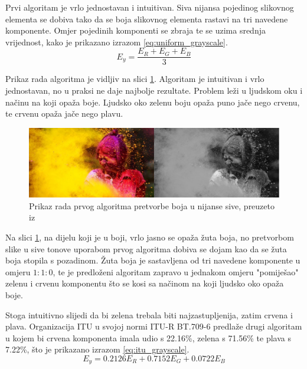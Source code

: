 Prvi algoritam je vrlo jednostavan i intuitivan. Siva nijansa pojedinog slikovnog elementa se dobiva tako da se boja slikovnog elementa rastavi na tri navedene komponente. Omjer pojedinih komponenti se zbraja te se uzima srednja vrijednost, kako je prikazano izrazom \eqref{eq:uniform_grayscale}.
\begin{equation} \label{eq:uniform_grayscale}
E_y = \frac{E_R + E_G + E_B}{3}
\end{equation}

Prikaz rada algoritma je vidljiv na slici \ref{fig:grayscale_uniform_example}. Algoritam je intuitivan i vrlo jednostavan, no u praksi ne daje najbolje rezultate. Problem leži u ljudskom oku i načinu na koji opaža boje. Ljudsko oko zelenu boju opaža puno jače nego crvenu, te crvenu opaža jače nego plavu.

\begin{figure}[htb]
    \centering
    \includegraphics[width=14.5cm]{images/grayscale_uniform_example_h.jpg}
    \caption{Prikaz rada prvog algoritma pretvorbe boja u nijanse sive, preuzeto iz \citep{grayscaleImg}}
    \label{fig:grayscale_uniform_example}
\end{figure}

Na slici \ref{fig:grayscale_uniform_example}, na dijelu koji je u boji, vrlo jasno se opaža žuta boja, no pretvorbom slike u sive tonove uporabom prvog algoritma dobiva se dojam kao da se žuta boja stopila s pozadinom. Žuta boja je sastavljena od tri navedene komponente u omjeru $1:1:0$, te je predloženi algoritam zapravo u jednakom omjeru "pomiješao" zelenu i crvenu komponentu što se kosi sa načinom na koji ljudsko oko opaža boje.

Stoga intuitivno slijedi da bi zelena trebala biti najzastupljenija, zatim crvena i plava. Organizacija ITU  u svojoj normi ITU-R BT.709-6 \citep{ITUgrayscale} predlaže drugi algoritam u kojem bi crvena komponenta imala udio s 22.16\%, zelena s 71.56\% te plava s 7.22\%, što je prikazano izrazom \eqref{eq:itu_grayscale}.
\begin{equation} \label{eq:itu_grayscale}
E_y = 0.2126E_R + 0.7152E_G + 0.0722E_B
\end{equation}

